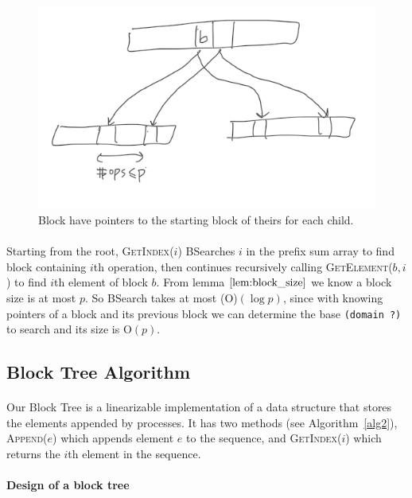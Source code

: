 \documentclass[10pt]{article}
\theoremstyle{definition}
\begin{document}
\begin{figure}[hbt]
\centering
  \includegraphics[width=5in]{pics/pointers}
  \caption{Block have pointers to the starting block of theirs for each child. \label{fig::pointer}}
\end{figure}

\paragraph{}
Starting from the root, \textsc{GetIndex}($i$) BSearches $i$ in the prefix sum array to find block containing $i$th operation, then continues recursively calling \textsc{GetElement}($b,i$) to find $i$th element of block $b$. From lemma $\ref{lem:block_size}$ we know a block size is at most $p$. So BSearch takes at most \textsc(O)$(\log p)$, since  with knowing pointers of a block and its previous block we can determine the base \texttt{(domain ?)} to search and its size is \textsc{O}$(p)$.

\subsection{Block Tree Algorithm}
\paragraph{}
Our Block Tree is a linearizable implementation of a data structure that stores the elements appended by processes. It has two methods (see Algorithm~\ref{alg2}), \textsc{Append}($e$) which appends element $e$ to the sequence, and \textsc{GetIndex}($i$) which returns the $i$th element in the sequence.

\paragraph{Design of a block tree}
\end{document}
